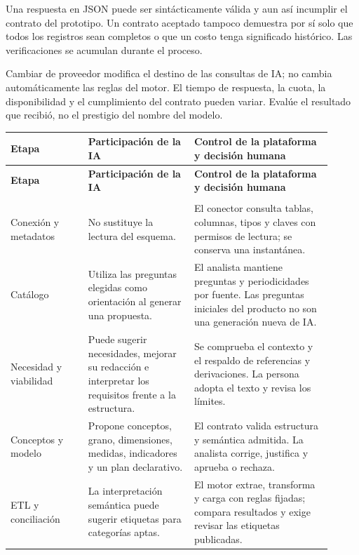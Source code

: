 Una respuesta en JSON puede ser sintácticamente válida y aun así incumplir el contrato del prototipo. Un contrato aceptado tampoco demuestra por sí solo que todos los registros sean completos o que un costo tenga significado histórico. Las verificaciones se acumulan durante el proceso.

Cambiar de proveedor modifica el destino de las consultas de IA; no cambia automáticamente las reglas del motor. El tiempo de respuesta, la cuota, la disponibilidad y el cumplimiento del contrato pueden variar. Evalúe el resultado que recibió, no el prestigio del nombre del modelo.

\begingroup
\fontsize{10}{12.5}\selectfont
\setlength{\tabcolsep}{5pt}
\renewcommand{\arraystretch}{1.15}
\begin{longtable}{@{}>{\RaggedRight\arraybackslash}p{0.22\linewidth}>{\RaggedRight\arraybackslash}p{0.3\linewidth}>{\RaggedRight\arraybackslash}p{0.39\linewidth}@{}}
\toprule
\textbf{Etapa} & \textbf{Participación de la IA} & \textbf{Control de la plataforma y decisión humana} \\
\midrule
\endfirsthead
\toprule
\textbf{Etapa} & \textbf{Participación de la IA} & \textbf{Control de la plataforma y decisión humana} \\
\midrule
\endhead
\midrule
\multicolumn{3}{r}{\footnotesize Continúa en la página siguiente}\\
\endfoot
\bottomrule
\endlastfoot
Conexión y metadatos & No sustituye la lectura del esquema. & El conector consulta tablas, columnas, tipos y claves con permisos de lectura; se conserva una instantánea. \\
\addlinespace[3pt]
Catálogo & Utiliza las preguntas elegidas como orientación al generar una propuesta. & El analista mantiene preguntas y periodicidades por fuente. Las preguntas iniciales del producto no son una generación nueva de IA. \\
\addlinespace[3pt]
Necesidad y viabilidad & Puede sugerir necesidades, mejorar su redacción e interpretar los requisitos frente a la estructura. & Se comprueba el contexto y el respaldo de referencias y derivaciones. La persona adopta el texto y revisa los límites. \\
\addlinespace[3pt]
Conceptos y modelo & Propone conceptos, grano, dimensiones, medidas, indicadores y un plan declarativo. & El contrato valida estructura y semántica admitida. La analista corrige, justifica y aprueba o rechaza. \\
\addlinespace[3pt]
ETL y conciliación & La interpretación semántica puede sugerir etiquetas para categorías aptas. & El motor extrae, transforma y carga con reglas fijadas; compara resultados y exige revisar las etiquetas publicadas. \\

\end{longtable}
